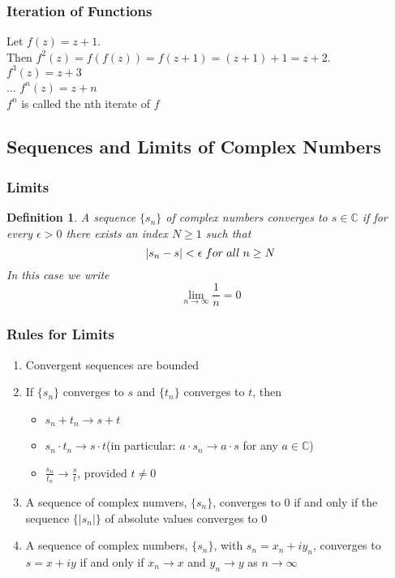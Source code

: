 \documentclass{article}
\newtheorem{definition}{Definition}[section]
\begin{document}
\subsubsection{Iteration of Functions}
Let $f(z) = z +1$. \\
Then $f^2(z) = f(f(z)) = f(z+1) = (z+1) + 1= z + 2$.\\
$f^3(z) = z + 3$ \\
... $f^n(z) = z + n$ \\
$f^n$ is called the nth iterate of $f$

\subsection{Sequences and Limits of Complex Numbers}

\subsubsection{Limits}
\begin{definition}
A sequence $\{s_n\}$ of complex numbers converges to $s \in \mathbb{C}$ if for every $\epsilon > 0$ there exists an index $N \geq 1$ such that
\begin{equation*}
\left|s_n - s\right| < \epsilon \hspace{0.1cm} for \hspace{0.1cm} all \hspace{0.1cm} n \geq N
\end{equation*}
In this case we write
\begin{equation*}
\lim_{n\to\infty}\frac{1}{n}=0
\end{equation*}
\end{definition}

\subsubsection{Rules for Limits}
\begin{enumerate}
\item Convergent sequences are bounded
\item If $\{s_n\}$ converges to $s$ and $\{t_n\}$ converges to $t$, then
\begin{itemize}
\item $s_n + t_n \to s + t$
\item $s_n \cdot t_n \to s \cdot t$(in particular: $a \cdot s_n \to a \cdot s$ for any $a \in \mathbb{C}$)
\item $\frac{s_n}{t_n} \to \frac{s}{t}$, provided $t \neq 0$
\end{itemize}
\item A sequence of complex numvers, $\{s_n\}$, converges to 0 if and only if the sequence $\{\left|s_n\right|\}$ of absolute values converges to 0
\item A sequence of complex numbers, $\{s_n\}$, with $s_n = x_n + iy_n$, converges to $s = x + iy$ if and only if $x_n \to x$ and $y_n \to y$ as $n \to \infty$
\end{enumerate}
\end{document}
